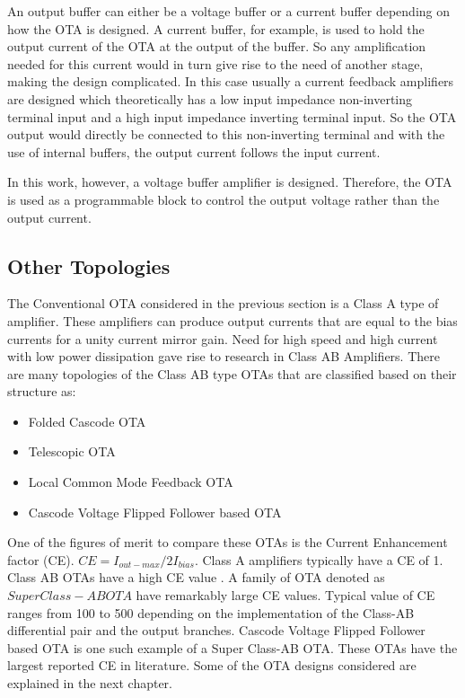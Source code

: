 An output buffer can either be a voltage buffer or a current buffer depending on how the OTA is designed. A current buffer, for example, is used to hold the output current of the OTA at the output of the buffer. So any amplification needed for this current would in turn give rise to the need of another stage, making the design complicated. In this case usually a current feedback amplifiers are designed which theoretically has a low input impedance non-inverting terminal input and a high input impedance inverting terminal input. So the OTA output would directly be connected to this non-inverting terminal and with the use of internal buffers, the output current follows the input current.

In this work, however, a voltage buffer amplifier is designed. Therefore, the OTA is used as a programmable block to control the output voltage rather than the output current.

\subsection{Other Topologies}
The Conventional OTA considered in the previous section is a Class A type of amplifier. These amplifiers can produce output currents that are equal to the bias currents for a unity current mirror gain. Need for high speed and high current with low power dissipation gave rise to research in Class AB Amplifiers. There are many topologies of the Class AB type OTAs that are classified based on their structure as:
\begin{itemize}
\item Folded Cascode OTA \cite{folded_cascode}
\item Telescopic OTA \cite{telescopic}
\item Local Common Mode Feedback OTA \cite{lcmfb_ota}
\item Cascode Voltage Flipped Follower based OTA \cite{super_class_ab}
\end{itemize}

One of the figures of merit to compare these OTAs is the Current Enhancement factor (CE). $CE = I_{out-max}/2I_{bias}$. Class A amplifiers typically have a CE of 1. Class AB OTAs have a high CE value \cite{pourashraf2017high}. A family of OTA denoted as $Super Class-AB OTA$ have remarkably large CE values. Typical value of CE ranges from 100 to 500 depending on the implementation of the Class-AB differential pair and the output branches. Cascode Voltage Flipped Follower based OTA is one such example of a Super Class-AB OTA. These OTAs have the largest reported CE in literature. Some of the OTA designs considered are explained in the next chapter.

